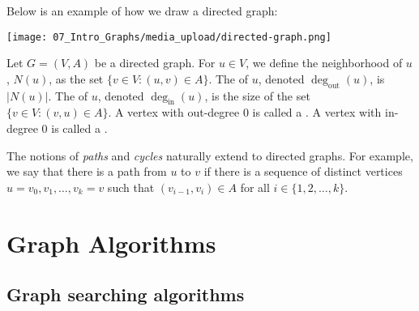\begin{note}
\label{note:Drawing-directed-graphs}
Below is an example of how we draw a directed graph:
\begin{center}
    \texttt{[image: 07\_Intro\_Graphs/media\_upload/directed-graph.png]}
\end{center}

\end{note}

\begin{definition}
\label{definition:Neighborhood-out-degree-in-degree-sink-source} 
Let $G = (V,A)$ be a directed graph. For $u \in V$, we define the neighborhood of $u$, $N(u)$, as the set $\{v \in V : (u,v) \in A\}$. The  of $u$, denoted $\deg_\text{out}(u)$, is $|N(u)|$. The  of $u$, denoted $\deg_\text{in}(u)$, is the size of the set $\{v \in V : (v,u) \in A\}$. A vertex with out-degree 0 is called a . A vertex with in-degree 0 is called a .

\end{definition}

\begin{note}
\label{note:Paths-and-cycles-in-directed-graphs}
The notions of \emph{paths} and \emph{cycles} naturally extend to directed graphs. For example, we say that there is a path from $u$ to $v$ if there is a sequence of distinct vertices $u = v_0,v_1,\ldots,v_k = v$ such that $(v_{i-1}, v_i) \in A$ for all $i \in \{1,2,\ldots,k\}$. 

\end{note}


\section{Graph Algorithms}
\label{sec:intro-to-graph-theory::graph-algorithms}


\subsection{Graph searching algorithms}
\label{sec:intro-to-graph-theory::graph-searching-algorithms}

